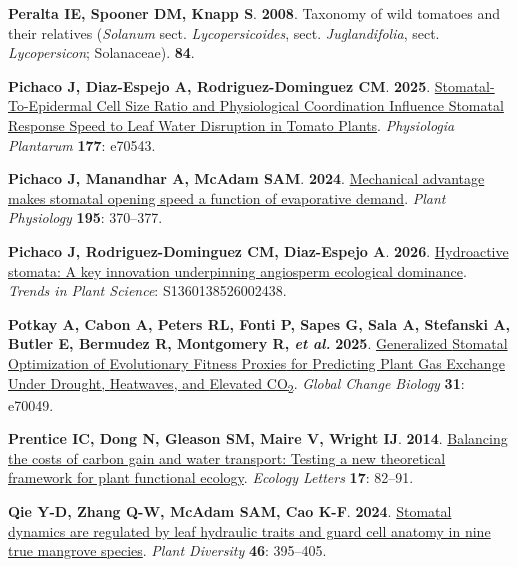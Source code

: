 \documentclass[
  letterpaper,
  DIV=11,
  numbers=noendperiod]{scrartcl}
\newlength{\cslhangindent}
\newenvironment{CSLReferences}[2] %
 {\begin{list}{}{%
  \setlength{\itemindent}{0pt}
  \setlength{\leftmargin}{0pt}
  \setlength{\parsep}{0pt}
  \ifodd #1
   \setlength{\leftmargin}{\cslhangindent}
   \setlength{\itemindent}{-1\cslhangindent}
  \fi
  \setlength{\itemsep}{#2\baselineskip}}}
 {\end{list}}
\begin{document}
\begin{CSLReferences}{0}{1}
\textbf{\textbf{Peralta IE}, \textbf{Spooner DM}, \textbf{Knapp S}}.
\textbf{2008}. Taxonomy of wild tomatoes and their relatives
({\emph{Solanum}} sect. {\emph{Lycopersicoides}}, sect.
{\emph{Juglandifolia}}, sect. {\emph{Lycopersicon}}; {Solanaceae}).
\textbf{84}.

\textbf{\textbf{Pichaco J}, \textbf{Diaz-Espejo A},
\textbf{Rodriguez-Dominguez CM}}. \textbf{2025}.
\href{https://doi.org/10.1111/ppl.70543}{Stomatal-{To-Epidermal Cell
Size Ratio} and {Physiological Coordination Influence Stomatal Response
Speed} to {Leaf Water Disruption} in {Tomato Plants}}. \emph{Physiologia
Plantarum} \textbf{177}: e70543.

\textbf{\textbf{Pichaco J}, \textbf{Manandhar A}, \textbf{McAdam SAM}}.
\textbf{2024}. \href{https://doi.org/10.1093/plphys/kiae023}{Mechanical
advantage makes stomatal opening speed a function of evaporative
demand}. \emph{Plant Physiology} \textbf{195}: 370--377.

\textbf{\textbf{Pichaco J}, \textbf{Rodriguez-Dominguez CM},
\textbf{Diaz-Espejo A}}. \textbf{2026}.
\href{https://doi.org/10.1016/j.tplants.2026.07.013}{Hydroactive
stomata: A key innovation underpinning angiosperm ecological dominance}.
\emph{Trends in Plant Science}: S1360138526002438.

\textbf{\textbf{Potkay A}, \textbf{Cabon A}, \textbf{Peters RL},
\textbf{Fonti P}, \textbf{Sapes G}, \textbf{Sala A}, \textbf{Stefanski
A}, \textbf{Butler E}, \textbf{Bermudez R}, \textbf{Montgomery R},
\emph{et al.}} \textbf{2025}.
\href{https://doi.org/10.1111/gcb.70049}{Generalized {Stomatal
Optimization} of {Evolutionary Fitness Proxies} for {Predicting Plant
Gas Exchange Under Drought}, {Heatwaves}, and {Elevated
CO}{\textsubscript{2}}}. \emph{Global Change Biology} \textbf{31}:
e70049.

\textbf{\textbf{Prentice IC}, \textbf{Dong N}, \textbf{Gleason SM},
\textbf{Maire V}, \textbf{Wright IJ}}. \textbf{2014}.
\href{https://doi.org/10.1111/ele.12211}{Balancing the costs of carbon
gain and water transport: Testing a new theoretical framework for plant
functional ecology}. \emph{Ecology Letters} \textbf{17}: 82--91.

\textbf{\textbf{Qie Y-D}, \textbf{Zhang Q-W}, \textbf{McAdam SAM},
\textbf{Cao K-F}}. \textbf{2024}.
\href{https://doi.org/10.1016/j.pld.2024.02.003}{Stomatal dynamics are
regulated by leaf hydraulic traits and guard cell anatomy in nine true
mangrove species}. \emph{Plant Diversity} \textbf{46}: 395--405.


\end{CSLReferences}
\end{document}
